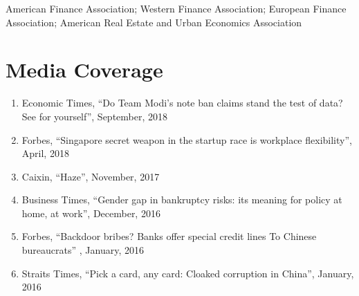 \documentclass[margin,line]{res}
\newenvironment{list1}{
  \begin{list}{\ding{113}}{%
      \setlength{\itemsep}{0in}
      \setlength{\parsep}{0in} \setlength{\parskip}{0in}
      \setlength{\topsep}{0in} \setlength{\partopsep}{0in} 
      \setlength{\leftmargin}{0.17in}}}{\end{list}}
\begin{document}
\begin{resume}
\begin{list1}
	\begin{list1}
		\item[] American Finance Association; Western Finance Association; European Finance Association; American Real Estate and Urban Economics Association 
	\end{list1}
\end{list1}



\section{\sc Media Coverage}
\begin{enumerate}

	\item %
	Economic Times, ``Do Team Modi's note ban claims stand the test of data? See for yourself'', September, 2018	
	\item %
	Forbes, ``Singapore secret weapon in the startup race is workplace flexibility'', April, 2018 
	\item %
	Caixin, ``Haze'',
	November, 2017	
	\item %
	 Business Times, ``Gender gap in bankruptcy risks: its meaning for policy at home, at work'', December, 2016
	\item %
	Forbes, ``Backdoor bribes? Banks offer special credit lines To Chinese bureaucrats'' , January, 2016
	\item %
	Straits Times, ``Pick a card, any card: Cloaked corruption in China'', January, 2016	


\end{enumerate}
\end{resume}
\end{document}
